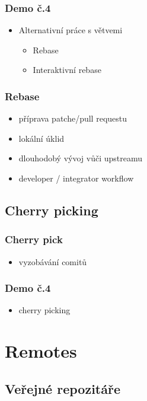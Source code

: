 \documentclass[pdftex]{beamer}
\begin{document}
\begin{frame}
	\frametitle{Demo č.4}
	\begin{itemize}
		\item Alternativní práce s větvemi
		\begin{itemize} \item Rebase \end{itemize}
		\begin{itemize} \item Interaktivní rebase \end{itemize}
	\end{itemize}
\end{frame}

\begin{frame}
	\frametitle{Rebase}
	\begin{itemize}
		\item příprava patche/pull requestu
		\item lokální úklid
		\item dlouhodobý vývoj vůči upstreamu
		\item developer / integrator workflow
	\end{itemize}
\end{frame}

\subsection{Cherry picking}

\begin{frame}
	\frametitle{Cherry pick}
	\begin{itemize}
		\item vyzobávání comitů
	\end{itemize}
\end{frame}

\begin{frame}
	\frametitle{Demo č.4}
	\begin{itemize}
		\item cherry picking
	\end{itemize}
\end{frame}

\section{Remotes}
\subsection{Veřejné repozitáře}
\end{document}
